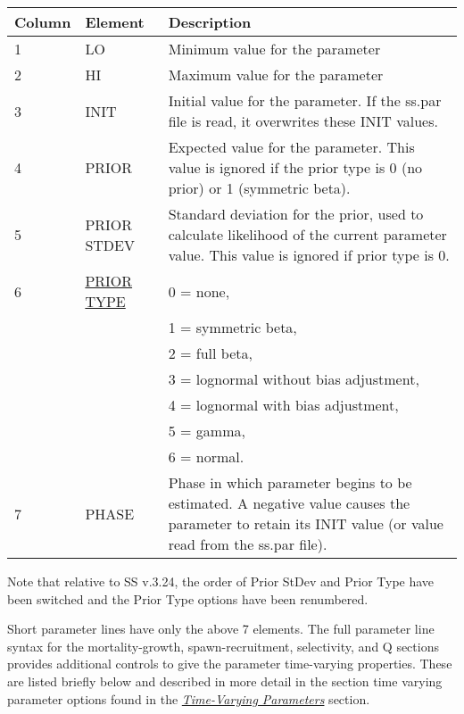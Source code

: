 \hypertarget{Priors}{} \hypertarget{paraOrder}{}
\begin{center}
	\begin{tabular}{p{2cm} p{3cm} p{10cm}}
		\hline
		Column & Element & Description \Tstrut\Bstrut\\
		\hline
		1 & LO & Minimum value for the parameter\Tstrut\\
		2 & HI & Maximum value for the parameter\Tstrut\\
		3 \Tstrut & INIT & Initial value for the parameter.  If the ss.par file is read, it overwrites these INIT values.\\
		4 \Tstrut & PRIOR & Expected value for the parameter.  This value is ignored if the prior type is 0 (no prior) or 1 (symmetric beta).\\
		5 \Tstrut & PRIOR STDEV & Standard deviation for the prior, used to calculate likelihood of the current parameter value. This value is ignored if prior type is 0.\\
		6 \Tstrut & \hyperlink{PriorDescrip}{PRIOR TYPE}  & 0 = none, \\
		& & 1 = symmetric beta, \\
		& & 2 = full beta, \\
		& & 3 = lognormal without bias adjustment, \\
		& & 4 = lognormal with bias adjustment, \\
		& & 5 = gamma, \\
		& & 6 = normal. \\
		7 \Tstrut & PHASE & Phase in which parameter begins to be estimated.  A negative value causes the parameter to retain its INIT value (or value read from the ss.par file).\Bstrut\\
		\hline
	\end{tabular}
\end{center}

Note that relative to SS v.3.24,  the order of Prior StDev and Prior Type have been switched and the Prior Type options have been renumbered.

Short parameter lines have only the above 7 elements.  The full parameter line syntax for the mortality-growth, spawn-recruitment, selectivity, and Q sections provides additional controls to give the parameter time-varying properties.  These are listed briefly below and described in more detail in the section time varying parameter options found in the \hyperlink{TVpara}{\textit{Time-Varying Parameters}} section.

